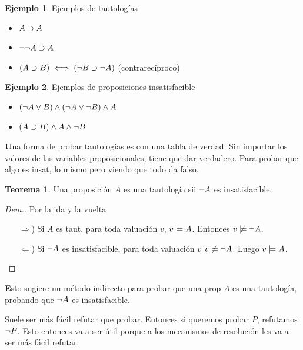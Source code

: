 \documentclass{report}
\theoremstyle{definition} %
\newtheorem{theorem}{Teorema}[chapter]
\newtheorem*{example*}{Ejemplo}
\newenvironment{nota}[1]
    {\begin{leftbar}\textbf{#1}}
    {\end{leftbar}}
\begin{document}
\begin{example*}
    Ejemplos de tautologías
    \begin{itemize}
        \item $A \supset A$
        \item $\neg \neg A \supset A$
        \item $(A \supset B) \iff (\neg B \supset \neg A)$ (contrarecíproco)
    \end{itemize}
    
\end{example*}

\begin{example*} Ejemplos de proposiciones insatisfacible
    \begin{itemize}
        \item $(\neg A \vee B) \wedge (\neg A \vee \neg B) \wedge A$
        \item \(
            \y
                {(\impl{A}{B})}
                {\y
                {A}
                {\no{B}}
                }
        \)
    \end{itemize}
\end{example*}

\begin{nota}
    Una forma de probar tautologías es con una tabla de verdad. Sin importar los
    valores de las variables proposicionales, tiene que dar verdadero. Para
    probar que algo es insat, lo mismo pero viendo que todo da falso.
\end{nota}

\begin{theorem}\label{teo:taut-sii-insat}
    Una proposición $A$ es una tautología sii $\neg A$ es insatisfacible.
\end{theorem}
\begin{proof}[Dem.] Por la ida y la vuelta
    \begin{itemize}
        \item[$\Rightarrow$)] Si $A$ es taut. para toda valuación $v$,
        $v \models A$. Entonces $v \not\models \neg A$.
        \item[$\Leftarrow$)] Si $\neg A$ es insatisfacible, para toda valuación
        $v$ $v \not\models \neg A$. Luego $v \models A$.
    \end{itemize}
\end{proof}

\begin{nota}
Esto sugiere un método indirecto para probar que una prop $A$ es una
tautología, probando que $\neg A$ es insatisfacible.

Suele ser más fácil refutar que probar. Entonces si queremos probar $P$,
refutamos $\neg P$. Esto entonces va a ser útil porque a los mecanismos de
resolución les va a ser más fácil refutar.
\end{nota}
\end{document}
